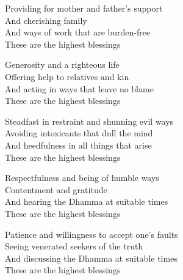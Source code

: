 \begin{english-only}
  Providing for mother and father's support\\
  And cherishing family\\
  And ways of work that are burden-free\ifdigital\makeatletter\hyperlink{endnote155-appendix}\fi\\
  These are the highest blessings
\end{english-only}

\begin{english-only}
  Generosity and a righteous life\\
  Offering help to relatives and kin\\
  And acting in ways that leave no blame\\
  These are the highest blessings
\end{english-only}

\begin{english-only}
  Steadfast in restraint and shunning evil ways\\
  Avoiding intoxicants that dull the mind\\
  And heedfulness in all things that arise\\
  These are the highest blessings
\end{english-only}

\ifninebythirteen\clearpage\fi

\begin{english-only}
  Respectfulness and being of humble ways\\
  Contentment and gratitude\\
  And hearing the Dhamma at suitable times\ifdigital\makeatletter\hyperlink{endnote151-appendix}\fi\\
  These are the highest blessings
\end{english-only}

\begin{english-only}
  Patience and willingness to accept one's faults\\
  Seeing venerated seekers of the truth\\
  And discussing the Dhamma at suitable times\ifdigital\makeatletter\hyperlink{endnote151-appendix}\fi\\
  These are the highest blessings
\end{english-only}

